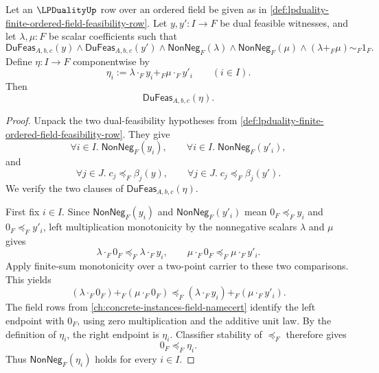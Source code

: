 \begin{theorem}
\label{thm:lpduality-dual-feasibility-binary-convex-closure}
Let an $\LPDualityUp$ row over an ordered field be given as in \autoref{def:lpduality-finite-ordered-field-feasibility-row}. Let $y,y':I\to F$ be dual feasible witnesses, and let $\lambda,\mu:F$ be scalar coefficients such that
$$
\mathsf{DuFeas}_{A,b,c}(y)
\land
\mathsf{DuFeas}_{A,b,c}(y')
\land
\mathsf{NonNeg}_F(\lambda)
\land
\mathsf{NonNeg}_F(\mu)
\land
(\lambda+_F\mu)\sim_F1_F.
$$
Define $\eta:I\to F$ componentwise by
$$
\eta_i:=\lambda\cdot_F y_i+_F\mu\cdot_F y'_i
\qquad (i\in I).
$$
Then
$$
\mathsf{DuFeas}_{A,b,c}(\eta).
$$
\end{theorem}
\begin{proof}
Unpack the two dual-feasibility hypotheses from \autoref{def:lpduality-finite-ordered-field-feasibility-row}. They give
$$
\forall i\in I.\; \mathsf{NonNeg}_F(y_i),
\qquad
\forall i\in I.\; \mathsf{NonNeg}_F(y'_i),
$$
and
$$
\forall j\in J.\; c_j\preceq_F\beta_j(y),
\qquad
\forall j\in J.\; c_j\preceq_F\beta_j(y').
$$
We verify the two clauses of $\mathsf{DuFeas}_{A,b,c}(\eta)$.

First fix $i\in I$. Since $\mathsf{NonNeg}_F(y_i)$ and $\mathsf{NonNeg}_F(y'_i)$ mean $0_F\preceq_F y_i$ and $0_F\preceq_F y'_i$, left multiplication monotonicity by the nonnegative scalars $\lambda$ and $\mu$ gives
$$
\lambda\cdot_F0_F\preceq_F\lambda\cdot_F y_i,
\qquad
\mu\cdot_F0_F\preceq_F\mu\cdot_F y'_i.
$$
Apply finite-sum monotonicity over a two-point carrier to these two comparisons. This yields
$$
(\lambda\cdot_F0_F)+_F(\mu\cdot_F0_F)
\preceq_F
(\lambda\cdot_F y_i)+_F(\mu\cdot_F y'_i).
$$
The field rows from \autoref{ch:concrete-instances-field-namecert} identify the left endpoint with $0_F$, using zero multiplication and the additive unit law. By the definition of $\eta_i$, the right endpoint is $\eta_i$. Classifier stability of $\preceq_F$ therefore gives
$$
0_F\preceq_F\eta_i.
$$
Thus $\mathsf{NonNeg}_F(\eta_i)$ holds for every $i\in I$.


\end{proof}
